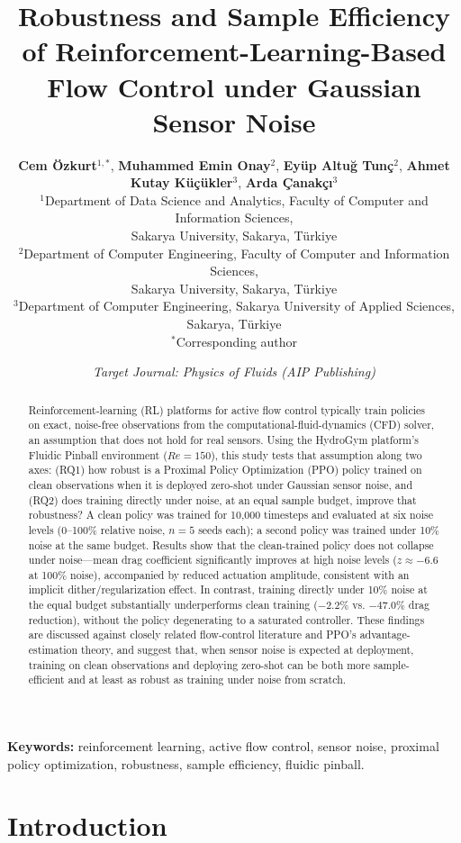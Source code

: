 \documentclass[11pt,a4paper]{article}
\title{\textbf{\Large Robustness and Sample Efficiency of Reinforcement-Learning-Based Flow Control under Gaussian Sensor Noise}}
\author{
  \textbf{Cem \"Ozkurt}$^{1,*}$,
  \textbf{Muhammed Emin Onay}$^{2}$,
  \textbf{Ey\"up Altu\u{g} Tun\c{c}}$^{2}$,
  \textbf{Ahmet Kutay K\"u\c{c}\"ukler}$^{3}$,
  \textbf{Arda \c{C}anak\c{c}\i}$^{3}$\\[2ex]
  \small $^{1}$Department of Data Science and Analytics, Faculty of Computer and Information Sciences,\\
  \small Sakarya University, Sakarya, T\"urkiye\\[0.5ex]
  \small $^{2}$Department of Computer Engineering, Faculty of Computer and Information Sciences,\\
  \small Sakarya University, Sakarya, T\"urkiye\\[0.5ex]
  \small $^{3}$Department of Computer Engineering, Sakarya University of Applied Sciences, Sakarya, T\"urkiye\\[0.5ex]
  \small $^{*}$Corresponding author
}
\date{\vspace{-1ex}\small\textit{Target Journal: Physics of Fluids (AIP Publishing)}}
\begin{document}
\maketitle

\begin{abstract}
\noindent Reinforcement-learning (RL) platforms for active flow control typically train policies on exact, noise-free observations from the computational-fluid-dynamics (CFD) solver, an assumption that does not hold for real sensors. Using the HydroGym platform's Fluidic Pinball environment ($Re=150$), this study tests that assumption along two axes: (RQ1) how robust is a Proximal Policy Optimization (PPO) policy trained on clean observations when it is deployed zero-shot under Gaussian sensor noise, and (RQ2) does training directly under noise, at an equal sample budget, improve that robustness? A clean policy was trained for 10,000 timesteps and evaluated at six noise levels (0--100\% relative noise, $n=5$ seeds each); a second policy was trained under 10\% noise at the same budget. Results show that the clean-trained policy does not collapse under noise---mean drag coefficient significantly improves at high noise levels ($z \approx -6.6$ at 100\% noise), accompanied by reduced actuation amplitude, consistent with an implicit dither/regularization effect. In contrast, training directly under 10\% noise at the equal budget substantially underperforms clean training ($-2.2\%$ vs. $-47.0\%$ drag reduction), without the policy degenerating to a saturated controller. These findings are discussed against closely related flow-control literature and PPO's advantage-estimation theory, and suggest that, when sensor noise is expected at deployment, training on clean observations and deploying zero-shot can be both more sample-efficient and at least as robust as training under noise from scratch.
\end{abstract}

\vspace{1ex}
\noindent \textbf{Keywords:} reinforcement learning, active flow control, sensor noise, proximal policy optimization, robustness, sample efficiency, fluidic pinball.

\section{Introduction}
\end{document}
